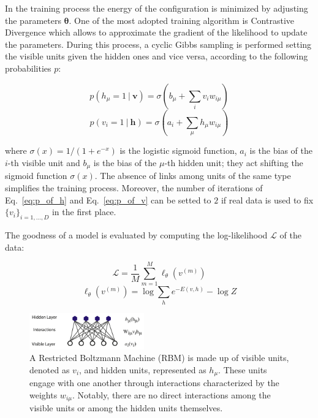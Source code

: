 \documentclass[prl,twocolumn]{revtex4-1}
\begin{document}
In the training process the energy of the configuration is minimized by adjusting the parameters $\boldsymbol{\theta}$. One of the most adopted training algorithm is Contrastive Divergence which allows to approximate the gradient of the likelihood to update the parameters. During this process, a cyclic Gibbs sampling is performed setting the visible units given the hidden ones and vice versa, according to the following probabilities $p$:

\begin{equation}
	p(h_\mu=1\ |\ \mathbf{v}) = \sigma(b_\mu + \sum_{i}v_iw_{i\mu})
	\label{eq:p_of_h}
\end{equation}
\begin{equation}
	p(v_i=1\ |\ \mathbf{h}) = \sigma(a_i + \sum_{\mu}h_{\mu}w_{i\mu})
	\label{eq:p_of_v}
\end{equation}

where $\sigma(x)=1/(1+e^{-x})$ is the logistic sigmoid function, $a_i$ is the bias of the $i$-th visible unit and $b_\mu$ is the bias of the $\mu$-th hidden unit; they act shifting the sigmoid function $\sigma(x)$. The absence of links among units of the same type simplifies the training process. Moreover, the number of iterations of Eq.~\ref{eq:p_of_h} and Eq.~\ref{eq:p_of_v} can be setted to $2$ if real data is used to fix $\{v_i\}_{i=1, ..., D}$ in the first place.

The goodness of a model is evaluated by computing the log-likelihood $\mathcal{L}$ of the data:

\begin{equation}
	\mathcal{L}=\frac{1}{M}\sum_{m=1}^{M}{\ell_{\theta}(v^{(m)})}
	\label{eq:Loglikelihood}
\end{equation}
\begin{equation}
	\ell_{\theta}(v^{(m)})=\log\sum_{h}{e^{-E(v,h)}-\log{Z}}
	\label{eq:loglikelihood}
\end{equation}

\begin{figure}[!tb]
	\includegraphics[width=0.44\textwidth]{RBM_structure.png}
	\caption{A Restricted Boltzmann Machine (RBM) is made up of visible units, denoted as $v_i$, and hidden units, represented as $h_\mu$. These units engage with one another through interactions characterized by the weights $w_{i\mu}$. Notably, there are no direct interactions among the visible units or among the hidden units themselves.}
	\label{fig:RBM_architecture}
\end{figure}
\end{document}
